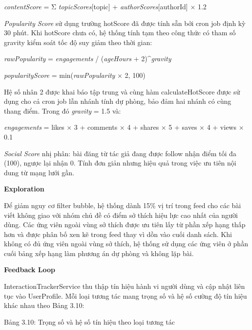 \emph{contentScore} = Σ \emph{topicScores}{[}topic{]} +
\emph{authorScores}{[}authorId{]} × 1.2

\emph{Popularity Score} sử dụng trường hotScore đã được tính sẵn bởi
cron job định kỳ 30 phút. Khi hotScore chưa có, hệ thống tính tạm theo
công thức có tham số gravity kiểm soát tốc độ suy giảm theo thời gian:

\emph{rawPopularity} = \emph{engagements} / (\emph{ageHours} +
2)\^{}\emph{gravity}

\emph{popularityScore} = min(\emph{rawPopularity} × 2, 100)

Hệ số nhân 2 được khai báo tập trung và cùng hàm calculateHotScore được
sử dụng cho cả cron job lẫn nhánh tính dự phòng, bảo đảm hai nhánh có
cùng thang điểm. Trong đó \emph{gravity} = 1.5 và:

\emph{engagements} = likes × 3 + comments × 4 + shares × 5 + saves × 4 +
views × 0.1

\emph{Social Score} nhị phân: bài đăng từ tác giả đang được follow nhận
điểm tối đa (100), ngược lại nhận 0. Tính đơn giản nhưng hiệu quả trong
việc ưu tiên nội dung từ mạng lưới gần.

\textbf{Exploration}

Để giảm nguy cơ filter bubble, hệ thống dành 15\% vị trí trong feed cho
các bài viết không giao với nhóm chủ đề có điểm sở thích hiệu lực cao
nhất của người dùng.
Các ứng viên ngoài vùng sở thích được ưu tiên lấy từ phần xếp hạng thấp
hơn và được phân bố xen kẽ trong feed thay vì dồn vào cuối danh sách.
Khi không có đủ ứng viên ngoài vùng sở thích, hệ thống sử dụng các ứng
viên ở phần cuối bảng xếp hạng làm phương án dự phòng và không lặp bài.

\textbf{Feedback Loop}

InteractionTrackerService thu thập tín hiệu hành vi người dùng và cập
nhật liên tục vào UserProfile. Mỗi loại tương tác mang trọng số và hệ số
cường độ tín hiệu khác nhau theo Bảng 3.10:

Bảng 3.10: Trọng số và hệ số tín hiệu theo loại tương tác

